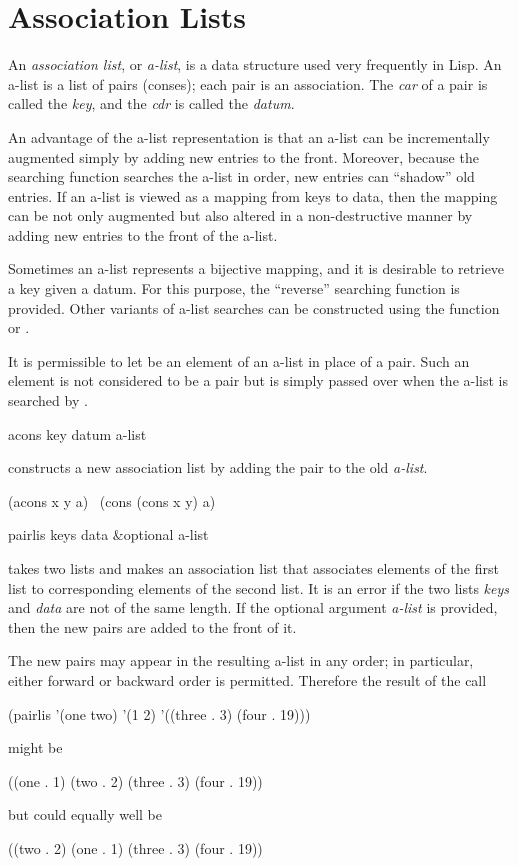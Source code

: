 \section{Association Lists}

An \emph{association list}, or \emph{a-list}, is a data structure
used very frequently in Lisp.  An a-list is a list of pairs (conses);
each pair is an association.  The \emph{car} of a pair is called the \emph{key},
and the \emph{cdr} is called the \emph{datum}.

An advantage of the a-list representation is that an a-list can be
incrementally augmented simply by adding new entries to the front.
Moreover, because the searching function  searches the
a-list in order, new entries can ``shadow'' old entries.  If an a-list is
viewed as a mapping from keys to data, then the mapping can be not only
augmented but also altered in a non-destructive manner by adding new
entries to the front of the a-list.

Sometimes an a-list represents a bijective mapping, and it is desirable
to retrieve a key given a datum.  For this purpose, the ``reverse'' searching
function  is provided.  Other variants of a-list searches
can be constructed using the function  or .

It is permissible to let {\false} be an element of an a-list in place of
a pair.  Such an element is not considered to be a pair but is simply
passed over when the a-list is searched by .

\begin{defun}[Function]
acons key datum a-list

 constructs a new association list by adding the pair
 to the old \emph{a-list}.
\begin{lisp}
(acons x y a) \EQ\ (cons (cons x y) a)
\end{lisp}
\end{defun}

\begin{defun}[Function]
pairlis keys data &optional a-list

 takes two lists and makes an association list that associates
elements of the first list to corresponding elements of the second
list.  It is an error if the two lists \emph{keys} and \emph{data} are not of
the same length.  If the optional argument \emph{a-list} is provided, then the
new pairs are added to the front of it.

The new pairs may appear in the resulting a-list in any order;
in particular, either forward or backward order is permitted.
Therefore the result of the call
\begin{lisp}
(pairlis '(one two) '(1 2) '((three . 3) (four . 19)))
\end{lisp}
might be
\begin{lisp}
((one . 1) (two . 2) (three . 3) (four . 19))
\end{lisp}
but could equally well be
\begin{lisp}
((two . 2) (one . 1) (three . 3) (four . 19))
\end{lisp}
\end{defun}

